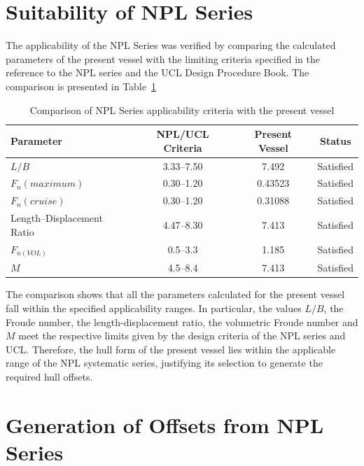 \documentclass[12pt,a4paper,twoside]{report}
\begin{document}
\section{Suitability of NPL Series}
The applicability of the NPL Series\cite{bailey1976npl} was verified by comparing the calculated parameters of the present vessel with the limiting criteria specified in the reference to the NPL series and the UCL Design Procedure Book\cite{ucl_ship_design_data_book}. The comparison is presented in Table~\ref{tab:npl_criteria}
\begin{table}[H]
\centering
\caption{Comparison of NPL Series applicability criteria with the present vessel}
\vspace{2mm}
\label{tab:npl_criteria}
\begin{tabular}{lccc}
\hline
\vspace{2mm}
\textbf{Parameter} & \textbf{NPL/UCL Criteria} & \textbf{Present Vessel} & \textbf{Status} \\
\hline
\vspace{2mm}
$L/B$ & 3.33--7.50 & 7.492 & Satisfied \\
$F_n (maximum)$ & 0.30--1.20 & 0.43523 & Satisfied \\
$F_n (cruise)$ & 0.30--1.20 & 0.31088 & Satisfied \\
Length--Displacement Ratio & 4.47--8.30 & 7.413 & Satisfied \\
$F_{n(VOL)}$ & 0.5--3.3 & 1.185 & Satisfied \\
$M$ & 4.5--8.4 & 7.413 & Satisfied \\
\hline
\end{tabular}
\end{table}
\vspace{\baselineskip}\par\noindent The comparison shows that all the parameters calculated for the present vessel fall within the specified applicability ranges. In particular, the values \(L/B\), the Froude number, the length-displacement ratio, the volumetric Froude number and \(M\) meet the respective limits given by the design criteria of the NPL series and UCL. Therefore, the hull form of the present vessel lies within the applicable range of the NPL systematic series, justifying its selection to generate the required hull offsets.
\section{Generation of Offsets from NPL Series}
\end{document}
